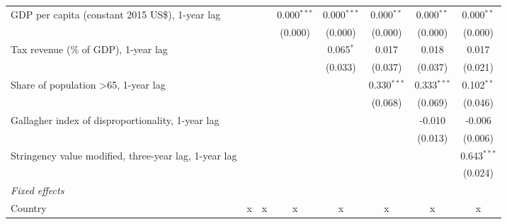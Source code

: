 \begin{tabular}{lccccccc}
   GDP per capita (constant 2015 US\$), 1-year lag                                         &              &              & 0.000$^{***}$ & 0.000$^{***}$ & 0.000$^{**}$  & 0.000$^{**}$  & 0.000$^{**}$\\   
                                                                                           &              &              & (0.000)       & (0.000)       & (0.000)       & (0.000)       & (0.000)\\   
   Tax revenue (\% of GDP), 1-year lag                                                     &              &              &               & 0.065$^{*}$   & 0.017         & 0.018         & 0.017\\   
                                                                                           &              &              &               & (0.033)       & (0.037)       & (0.037)       & (0.021)\\   
   Share of population >65, 1-year lag                                                     &              &              &               &               & 0.330$^{***}$ & 0.333$^{***}$ & 0.102$^{**}$\\   
                                                                                           &              &              &               &               & (0.068)       & (0.069)       & (0.046)\\   
   Gallagher index of disproportionality, 1-year lag                                       &              &              &               &               &               & -0.010        & -0.006\\   
                                                                                           &              &              &               &               &               & (0.013)       & (0.006)\\   
   Stringency value modified, three-year lag, 1-year lag                                   &              &              &               &               &               &               & 0.643$^{***}$\\   
                                                                                           &              &              &               &               &               &               & (0.024)\\   
   \emph{Fixed effects}\\
   Country                                                                                 & x            & x            & x             & x             & x             & x             & x\\  

\end{tabular}

